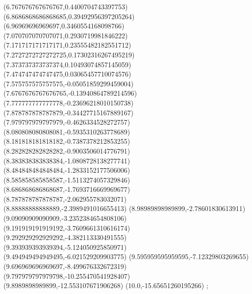 {(6.767676767676767,0.4400704743397753)
(6.8686868686868685,0.39492956397205264)
(6.96969696969697,0.3460554168098766)
(7.070707070707071,0.2930719981846222)
(7.171717171717171,0.23555482182551712)
(7.2727272727272725,0.17302316267495219)
(7.373737373737374,0.10493074857145059)
(7.474747474747475,0.03065457710074576)
(7.575757575757575,-0.05051859299459004)
(7.6767676767676765,-0.13940864789214596)
(7.777777777777778,-0.23696218010150738)
(7.878787878787879,-0.34427715167889167)
(7.979797979797979,-0.4626334528272757)
(8.080808080808081,-0.5935310263778689)
(8.181818181818182,-0.7387378212853255)
(8.282828282828282,-0.9003506014776791)
(8.383838383838384,-1.0808728138277741)
(8.484848484848484,-1.2833152177506006)
(8.585858585858587,-1.5113274057329846)
(8.686868686868687,-1.7693716669969677)
(8.787878787878787,-2.062955783032071)
(8.88888888888889,-2.3989491016655413)
(8.98989898989899,-2.78601830613911)
(9.09090909090909,-3.2352384654808106)
(9.191919191919192,-3.7609661310616174)
(9.292929292929292,-4.382113330491555)
(9.393939393939394,-5.124050925850971)
(9.494949494949495,-6.021529209903775)
(9.595959595959595,-7.12329803269655)
(9.696969696969697,-8.499676332672319)
(9.797979797979798,-10.255470541928407)
(9.8989898989899,-12.553107671906268)
(10.0,-15.65651260195266)
};
